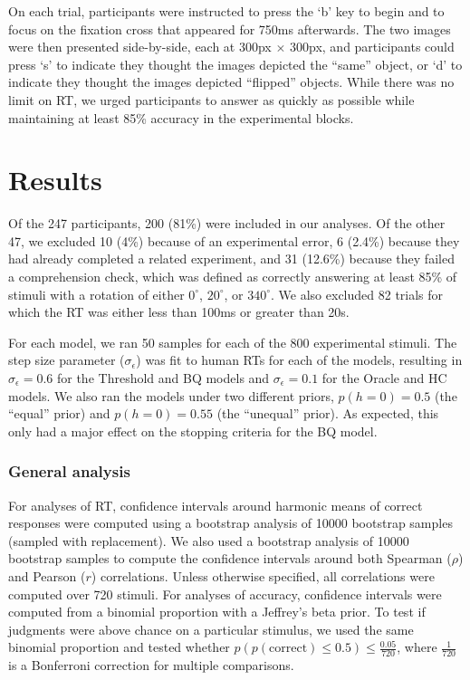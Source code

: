 \documentclass[10pt,letterpaper]{article}
\newcommand{\Oc}[0]{Oracle}
\newcommand{\Th}[0]{Threshold}
\newcommand{\Hc}[0]{HC}
\newcommand{\Bq}[0]{BQ}
\begin{document}
On each trial, participants were instructed to press the `b' key to
begin and to focus on the fixation cross that appeared for 750ms
afterwards. The two images were then presented side-by-side, each at
300px $\times$ 300px, and participants could press `s' to indicate
they thought the images depicted the ``same'' object, or `d' to
indicate they thought the images depicted ``flipped'' objects.  While
there was no limit on RT, we urged participants to answer as quickly
as possible while maintaining at least 85\% accuracy in the
experimental blocks.

\section{Results}

Of the 247 participants, 200 (81\%) were included in our analyses. Of
the other 47, we excluded 10 (4\%) because of an experimental error, 6
(2.4\%) because they had already completed a related experiment, and
31 (12.6\%) because they failed a comprehension check, which was
defined as correctly answering at least 85\% of stimuli with a
rotation of either $0^\circ$, $20^\circ$, or $340^\circ$.  We also
excluded 82 trials for which the RT was either less than 100ms or
greater than 20s.

For each model, we ran 50 samples for each of the 800 experimental
stimuli. The step size parameter ($\sigma_\epsilon$) was fit to human
RTs for each of the models, resulting in $\sigma_\epsilon=0.6$ for the
\Th{} and \Bq{} models and $\sigma_\epsilon=0.1$ for the \Oc{} and
\Hc{} models. We also ran the models under two different priors,
$p(h=0)=0.5$ (the ``equal'' prior) and $p(h=0)=0.55$ (the ``unequal''
prior). As expected, this only had a major effect on the stopping
criteria for the \Bq{} model.

\subsubsection{General analysis}

For analyses of RT, confidence intervals around harmonic means of
correct responses were computed using a bootstrap analysis of 10000
bootstrap samples (sampled with replacement).  We also used a
bootstrap analysis of 10000 bootstrap samples to compute the
confidence intervals around both Spearman ($\rho$) and Pearson ($r$)
correlations.  Unless otherwise specified, all correlations were
computed over 720 stimuli. For analyses of accuracy, confidence
intervals were computed from a binomial proportion with a Jeffrey's
beta prior.  To test if judgments were above chance on a particular
stimulus, we used the same binomial proportion and tested whether
$p\left(p(\textrm{correct})\leq 0.5\right)\leq \frac{0.05}{720}$,
where $\frac{1}{720}$ is a Bonferroni correction for multiple
comparisons.
\end{document}
